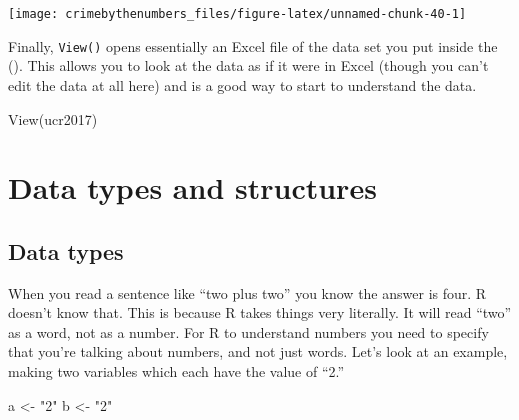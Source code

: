 \documentclass[
  a4paper,
]{krantz}
\makeatletter
\newenvironment{Shaded}{\begin{snugshade}}{\end{snugshade}}
\newcommand{\AttributeTok}[1]{\textcolor[rgb]{0.61,0.61,0.61}{#1}}
\newcommand{\FunctionTok}[1]{\textcolor[rgb]{0,0,0}{#1}}
\newcommand{\NormalTok}[1]{#1}
\newcommand{\OtherTok}[1]{\textcolor[rgb]{0.37,0.37,0.37}{#1}}
\newcommand{\SpecialCharTok}[1]{\textcolor[rgb]{0,0,0}{#1}}
\newcommand{\StringTok}[1]{\textcolor[rgb]{0.5,0.5,0.5}{#1}}
\newenvironment{kframe}{%
\medskip{}
\setlength{\fboxsep}{.8em}
 \def\at@end@of@kframe{}%
 \ifinner\ifhmode%
  \def\at@end@of@kframe{\end{minipage}}%
  \begin{minipage}{\columnwidth}%
 \fi\fi%
 \def\FrameCommand##1{\hskip\@totalleftmargin \hskip-\fboxsep
 \colorbox{shadecolor}{##1}\hskip-\fboxsep
     \hskip-\linewidth \hskip-\@totalleftmargin \hskip\columnwidth}%
 \MakeFramed {\advance\hsize-\width
   \@totalleftmargin\z@ \linewidth\hsize
   \@setminipage}}%
 {\par\unskip\endMakeFramed%
 \at@end@of@kframe}
\renewenvironment{Shaded}{\begin{kframe}}{\end{kframe}}
\makeatother
\begin{document}
\begin{Shaded}
\end{Shaded}

\begin{center}\texttt{[image: crimebythenumbers\_files/figure-latex/unnamed-chunk-40-1]} \end{center}

Finally, \texttt{View()} opens essentially an Excel file of
the data set you put inside the (). This allows you to look
at the data as if it were in Excel (though you can't edit
the data at all here) and is a good way to start to
understand the data.

\begin{Shaded}
\begin{Highlighting}[]
\FunctionTok{View}\NormalTok{(ucr2017)}
\end{Highlighting}
\end{Shaded}

\hypertarget{data-types}{%
\chapter{Data types and structures}\label{data-types}}

\hypertarget{section-data-types}{%
\section{Data types}\label{section-data-types}}

When you read a sentence like ``two plus two'' you know the
answer is four. R doesn't know that. This is because R takes
things very literally. It will read ``two'' as a word, not
as a number. For R to understand numbers you need to specify
that you're talking about numbers, and not just words. Let's
look at an example, making two variables which each have the
value of ``2.''

\begin{Shaded}
\begin{Highlighting}[]
\NormalTok{a }\OtherTok{\textless{}{-}} \StringTok{"2"}
\NormalTok{b }\OtherTok{\textless{}{-}} \StringTok{"2"}
\end{Highlighting}
\end{Shaded}
\end{document}
